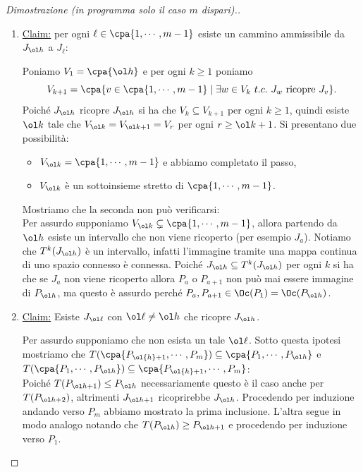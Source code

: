 \begin{proof}[Dimostrazione (in programma solo il caso $m$ dispari).]
\begin{enumerate}
\item \underline{Claim:} per ogni $\ell\in \cpa{1,\cdots, m-1}$ esiste un cammino ammissibile da $J_{\ol h}$ a $J_{\ell}$:

Poniamo $V_1=\cpa{\ol h}$ e per ogni $k\geq1$ poniamo 
\[V_{k+1}=\cpa{v\in \cpa{1,\cdots, m-1}\mid \exists w\in V_k\ t.c.\ J_w\text{ ricopre }J_v}.\]
Poich\'e $J_{\ol h}$ ricopre $J_{\ol h}$ si ha che $V_k\subseteq V_{k+1}$ per ogni $k\geq 1$, quindi esiste $\ol k$ tale che $V_{\ol k}=V_{\ol k+1}=V_r$ per ogni $r\geq \ol k+1$. Si presentano due possibilit\`a:
\begin{itemize}
\item $V_{\ol k}=\cpa{1,\cdots,m-1}$ e abbiamo completato il passo,
\item $V_{\ol k}$ \`e un sottoinsieme stretto di $\cpa{1,\cdots, m-1}$.
\end{itemize} 
Mostriamo che la seconda non pu\`o verificarsi:\\
Per assurdo supponiamo $V_{\ol k}\subsetneq \cpa{1,\cdots, m-1}$, allora partendo da $\ol h$ esiste un intervallo che non viene ricoperto (per esempio $J_a$). Notiamo che $T^k(J_{\ol h})$ \`e un intervallo, infatti l'immagine tramite una mappa continua di uno spazio connesso \`e connessa. Poich\'e $J_{\ol h}\subseteq T^k(J_{\ol h})$ per ogni $k$ si ha che se $J_{a}$ non viene ricoperto allora $P_a$ o $P_{a+1}$ non pu\`o mai essere immagine di $P_{\ol h}$, ma questo \`e assurdo perch\'e $P_a,P_{a+1}\in \Oc(P_1)=\Oc(P_{\ol h})$.
\item \underline{Claim:} Esiste $J_{\ol \ell}$ con $\ol \ell\neq \ol h$ che ricopre $J_{\ol h}$.

Per assurdo supponiamo che non esista un tale $\ol\ell$. Sotto questa ipotesi mostriamo che $T(\cpa{P_{\ol{h}+1},\cdots,P_m})\subseteq \cpa{P_1,\cdots, P_{\ol h}}$ e $T(\cpa{P_1,\cdots, P_{\ol h}})\subseteq \cpa{P_{\ol{h}+1},\cdots,P_m}$:\\
Poich\'e $T(P_{\ol h+1})\leq P_{\ol h}$ necessariamente questo \`e il caso anche per $T(P_{\ol h+2})$, altrimenti $J_{\ol h+1}$ ricoprirebbe $J_{\ol h}$. Procedendo per induzione andando verso $P_m$ abbiamo mostrato la prima inclusione. L'altra segue in modo analogo notando che $T(P_{\ol h})\geq P_{\ol h+1}$ e procedendo per induzione verso $P_1$.


\end{enumerate}
\end{proof}
